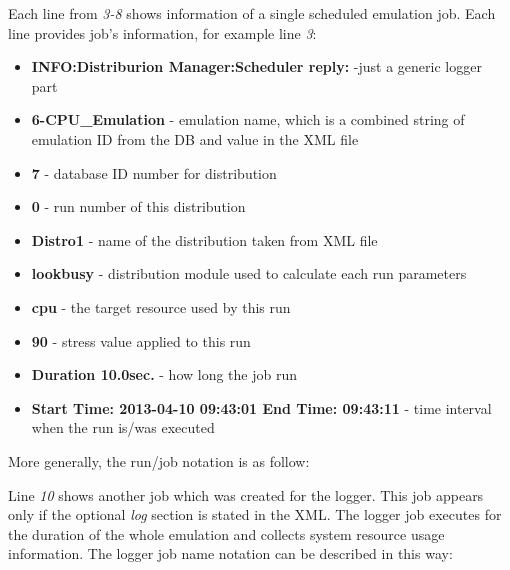 \documentclass[letterpaper,10pt,english]{sphinxhowto}
\begin{document}
Each line from \emph{3-8} shows information of a single scheduled emulation job. Each line provides job's information, for example line \emph{3}:
\begin{itemize}
\item {} 
\textbf{INFO:Distriburion Manager:Scheduler reply:} -just a generic logger part

\item {} 
\textbf{6-CPU\_Emulation} - emulation name, which is a combined string of emulation ID from the DB and  value in the XML file

\item {} 
\textbf{7} - database ID number for distribution

\item {} 
\textbf{0} - run number of this distribution

\item {} 
\textbf{Distro1} - name of the distribution taken from XML file

\item {} 
\textbf{lookbusy} - distribution module used to calculate each run parameters

\item {} 
\textbf{cpu} - the target resource used by this run

\item {} 
\textbf{90} - stress value applied to this run

\item {} 
\textbf{Duration 10.0sec.} - how long the job run

\item {} 
\textbf{Start Time: 2013-04-10 09:43:01 End Time: 09:43:11} - time interval when the run is/was executed

\end{itemize}

More generally, the run/job notation is as follow:


Line \emph{10} shows another job which was created for the logger. This job appears only if the optional \emph{log} section is stated in the XML. The logger job executes for the duration of the whole emulation and collects system resource usage information. The logger job name notation can be described in this way:

\end{document}
